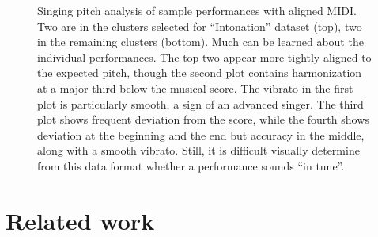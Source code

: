 \begin{appendices}
\begin{figure}[h!]
    \vspace{-0.5in}
    \caption{Singing pitch analysis of sample performances with aligned MIDI. Two are in the clusters selected for  ``Intonation'' dataset (top), two in the remaining clusters (bottom). Much can be learned about the individual performances. The top two appear more tightly aligned to the expected pitch, though the second plot contains harmonization at a major third below the musical score. The vibrato in the first plot is particularly smooth, a sign of an advanced singer. The third plot shows frequent deviation from the score, while the fourth shows deviation at the beginning and the end but accuracy in the middle, along with a smooth vibrato. Still, it is difficult visually determine from this data format whether a performance sounds ``in tune''.}
    \label{fig:sample_intonation}
\end{figure}

\section{Related work}
\label{sec:related}


\end{appendices}
